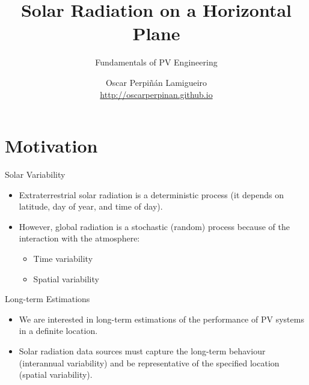 \documentclass[xcolor={usenames,svgnames,dvipsnames}]{beamer}
\author{Oscar Perpiñán Lamigueiro \\ \url{http://oscarperpinan.github.io}}
\date{}
\title{Solar Radiation on a Horizontal Plane}
\subtitle{Fundamentals of PV Engineering}
\begin{document}
\maketitle

\section{Motivation}
\label{sec:org8336c0c}
\begin{frame}[label={sec:org70f65bf}]{Solar Variability}
\begin{itemize}
\item Extraterrestrial solar radiation is a deterministic process (it depends on latitude, day of year, and time of day).
\item However, global radiation is a stochastic (random) process because of the interaction with the atmosphere:
\begin{itemize}
\item Time variability
\item Spatial variability
\end{itemize}
\end{itemize}
\end{frame}
\begin{frame}[label={sec:org8ddb3cd}]{Long-term Estimations}
\begin{itemize}
\item We are interested in \alert{long-term estimations} of the performance of PV systems in a definite location.
\item Solar radiation data sources must \alert{capture the long-term behaviour} (interannual variability) and be \alert{representative of the specified location} (spatial variability).
\end{itemize}
\end{frame}
\end{document}
